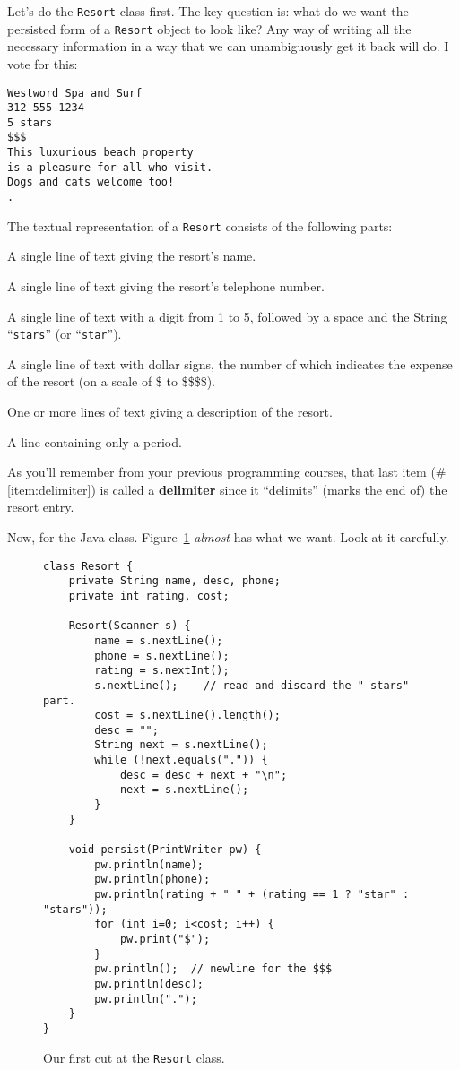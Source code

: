 Let's do the \texttt{Resort} class first. The key question is: what do we want
the persisted form of a \texttt{Resort} object to look like? Any way of
writing all the necessary information in a way that we can unambiguously get
it back will do. I vote for this:

\begin{Verbatim}[fontsize=\small,samepage=true,frame=lines]
Westword Spa and Surf
312-555-1234
5 stars
$$$
This luxurious beach property
is a pleasure for all who visit.
Dogs and cats welcome too!
.
\end{Verbatim}

The textual representation of a \texttt{Resort} consists of the following
parts:

\begin{compactenum}
\item A single line of text giving the resort's name.
\item A single line of text giving the resort's telephone number.
\item A single line of text with a digit from 1 to 5, followed by a space and
the String ``\texttt{stars}'' (or ``\texttt{star}'').
\item A single line of text with dollar signs, the number of which indicates
the expense of the resort (on a scale of \$ to \$\$\$\$).
\item One or more lines of text giving a description of the resort.
\item A line containing only a period. \label{item:delimiter}
\end{compactenum}

As you'll remember from your previous programming courses, that last item
(\#\ref{item:delimiter}) is called a \textbf{delimiter} since it ``delimits''
(marks the end of) the resort entry.

Now, for the Java class. Figure~\ref{fig:resort1} \textit{almost} has what we
want. Look at it carefully.

\begin{figure}[ht]
\centering
\begin{Verbatim}[fontsize=\footnotesize,samepage=true,frame=single]
class Resort {
    private String name, desc, phone;
    private int rating, cost;

    Resort(Scanner s) {
        name = s.nextLine();
        phone = s.nextLine();
        rating = s.nextInt();
        s.nextLine();    // read and discard the " stars" part.
        cost = s.nextLine().length();
        desc = "";
        String next = s.nextLine();
        while (!next.equals(".")) {
            desc = desc + next + "\n";
            next = s.nextLine();
        }
    }
    
    void persist(PrintWriter pw) {
        pw.println(name);
        pw.println(phone);
        pw.println(rating + " " + (rating == 1 ? "star" : "stars"));
        for (int i=0; i<cost; i++) {
            pw.print("$");
        }
        pw.println();  // newline for the $$$
        pw.println(desc);
        pw.println(".");
    }
}
\end{Verbatim}
\caption{Our first cut at the \texttt{Resort} class.}
\label{fig:resort1}
\end{figure}

